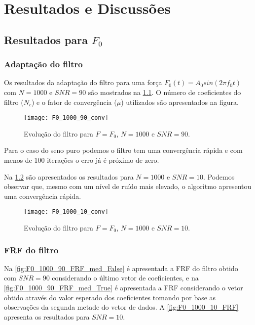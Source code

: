 \chapter{Resultados e Discussões}

\section{Resultados para $ F_0 $}\label{sec_F_0}
\subsection{Adaptação do filtro}

Os resultados da adaptação do filtro para uma força $F_0(t) = A_0 sin(2\pi f_0 t)$ com $ N=1000 $  e $ SNR = 90 $ são mostrados na \cref{fig:F0_1000_90_conv}. O número de coeficientes do filtro ($ N_c $) e o fator de convergência ($ \mu $) utilizados são apresentados na figura.

\begin{figure}[!h]
	\centering
	\texttt{[image: F0\_1000\_90\_conv]}
	\caption{Evolução do filtro para $ F=F_0 $, $ N=1000 $ e $ SNR=90 $.}
	\label{fig:F0_1000_90_conv}
\end{figure}

Para o caso do seno puro podemos o filtro tem uma convergência rápida e com menos de 100 iterações o erro já é próximo de zero. 

Na \cref{fig:F0_1000_10_conv} são apresentados os resultados para $ N=1000 $ e $ SNR=10 $. Podemos observar que, mesmo com um nível de ruído mais elevado, o algoritmo apresentou uma convergência rápida.

\begin{figure}
	\centering
	\texttt{[image: F0\_1000\_10\_conv]}
	\caption{Evolução do filtro para $ F=F_0 $, $ N=1000 $ e $ SNR=10 $.}
	\label{fig:F0_1000_10_conv}
\end{figure}

\subsection{FRF do filtro}

Na \cref{fig:F0_1000_90_FRF_med_False} é apresentada a FRF do filtro obtido com $ SNR=90 $ considerando o último vetor de coeficientes, e na \cref{fig:F0_1000_90_FRF_med_True} é apresentada a FRF considerando o vetor obtido através do valor esperado dos coeficientes tomando por base as observações da segunda metade do vetor de dados. A \cref{fig:F0_1000_10_FRF} apresenta os resultados para $ SNR=10 $. 

